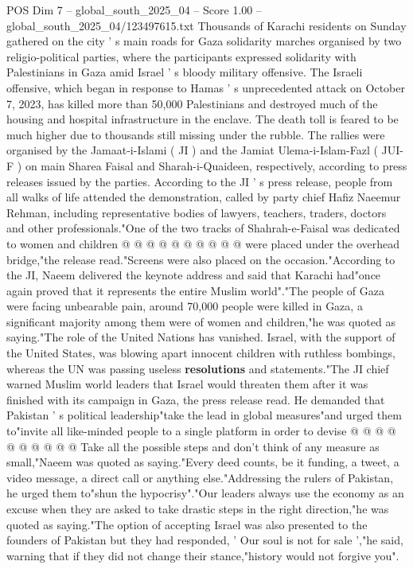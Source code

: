 \begin{textsample}{POS Dim 7 – global\_south\_2025\_04 – Score 1.00 – global\_south\_2025\_04/123497615.txt}  \label{ex:f7_pos_144}
Thousands of Karachi residents on Sunday gathered on the city ' s main roads for Gaza solidarity marches organised by two religio-political parties, where the participants expressed solidarity with Palestinians in Gaza amid Israel ' s bloody military offensive.
The Israeli offensive, which began in response to Hamas ' s unprecedented attack on October 7, 2023, has killed more than 50,000 Palestinians and destroyed much of the housing and hospital infrastructure in the enclave.
The death toll is feared to be much higher due to thousands still missing under the rubble.
The rallies were organised by the Jamaat-i-Islami ( JI ) and the Jamiat Ulema-i-Islam-Fazl ( JUI-F ) on main Sharea Faisal and Sharah-i-Quaideen, respectively, according to press releases issued by the parties.
According to the JI ' s press release, people from all walks of life attended the demonstration, called by party chief Hafiz Naeemur Rehman, including representative bodies of lawyers, teachers, traders, doctors and other professionals."One of the two tracks of Shahrah-e-Faisal was dedicated to women and children @ @ @ @ @ @ @ @ @ @ were placed under the overhead bridge,"the release read."Screens were also placed on the occasion."According to the JI, Naeem delivered the keynote address and said that Karachi had"once again proved that it represents the entire Muslim world"."The people of Gaza were facing unbearable pain, around 70,000 people were killed in Gaza, a significant majority among them were of women and children,"he was quoted as saying."The role of the United Nations has vanished.
Israel, with the support of the United States, was blowing apart innocent children with ruthless bombings, whereas the UN was passing useless \textbf{resolutions} and statements."The JI chief warned Muslim world leaders that Israel would threaten them after it was finished with its campaign in Gaza, the press release read.
He demanded that Pakistan ' s political leadership"take the lead in global measures"and urged them to"invite all like-minded people to a single platform in order to devise @ @ @ @ @ @ @ @ @ @ Take all the possible steps and don't think of any measure as small,"Naeem was quoted as saying."Every deed counts, be it funding, a tweet, a video message, a direct call or anything else."Addressing the rulers of Pakistan, he urged them to"shun the hypocrisy"."Our leaders always use the economy as an excuse when they are asked to take drastic steps in the right direction,"he was quoted as saying."The option of accepting Israel was also presented to the founders of Pakistan but they had responded, ' Our soul is not for sale ',"he said, warning that if they did not change their stance,"history would not forgive you".

\end{textsample}
